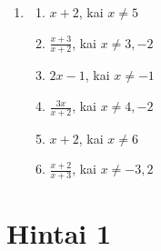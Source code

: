 \documentclass[11pt,a4paper]{scrartcl}
\begin{document}
\begin{enumerate}[label=\textbf{\arabic*.}, leftmargin=*]
\begin{enumerate}[label={(\arabic*)}]
        \item $(6x-1)(x+1)$
        \item $(x+3)(x-4)$
        \item $(5x-1)(2x+1)$
        \item $(x-7)(x-2)$
        \item $(3-x)(x+6)$
        \item $2(x-3)(x-4)$
        \item $-3(x-1)(x+3)$
        \item $(2x-1)(x+3)$
        \item $(1-x)(5x+2)$
        \item $(3x+2)(x-3)$
        \item $(3-2x)(x+1)$
    \end{enumerate}
    \item
    \begin{enumerate}[label={(\arabic*)}]
        \item $x+2$, kai $x\ne5$
        \item $\frac{x+3}{x+2}$, kai $x\ne3,-2$
        \item $2x-1$, kai $x\ne-1$
        \item $\frac{3x}{x+2}$, kai $x\ne4,-2$
        \item $x+2$, kai $x\ne6$
        \item $\frac{x+2}{x+3}$, kai $x\ne-3,2$
    \end{enumerate}
\end{enumerate}

\newpage
\section{Hintai 1}
\end{document}
